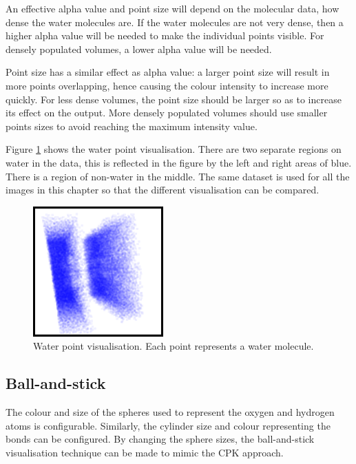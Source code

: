 An effective alpha value and point size will depend on the molecular data, how
dense the water molecules are. If the water molecules are not very dense, then
a higher alpha value will be needed to make the individual points visible. For
densely populated volumes, a lower alpha value will be needed.

Point size has a similar effect as alpha value: a larger point size will result
in more points overlapping, hence causing the colour intensity to increase more
quickly. For less dense volumes, the point size should be larger so as to
increase its effect on the output. More densely populated volumes should use
smaller points sizes to avoid reaching the maximum intensity value.

Figure \ref{fig:implementation_waterpoint} shows the water point visualisation.
There are two separate regions on water in the data, this is reflected in the
figure by the left and right areas of blue. There is a region of non-water in
the middle. The same dataset is used for all the images in this chapter so that
the different visualisation can be compared.

\begin{figure}
  \begin{center}
    \includegraphics[width=50mm]{waterpoint}
  \end{center}
  \caption{Water point visualisation. Each point represents a water molecule.}
  \label{fig:implementation_waterpoint}
\end{figure}


\subsection*{Ball-and-stick}

The colour and size of the spheres used to represent the oxygen and hydrogen
atoms is configurable. Similarly, the cylinder size and colour representing the
bonds can be configured. By changing the sphere sizes, the ball-and-stick
visualisation technique can be made to mimic the CPK approach.

